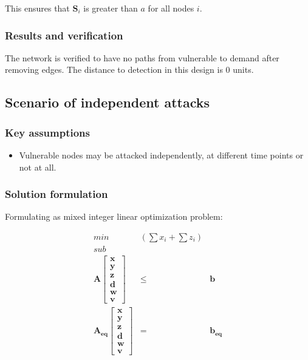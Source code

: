 \documentclass[authoryear,preprint,review,12pt]{elsarticle}
\begin{document}
This ensures that $\mathbf{S}_{i}$ is greater than $a$ for all nodes $i$.


\subsubsection{Results and verification}
The network is verified to have no paths from vulnerable to demand
after removing edges.
The distance to detection in this design is $0$ units.



\subsection{\label{sub:Scenario-3:independent-vulnerable}Scenario of independent attacks}
\subsubsection{Key assumptions}
\begin{itemize}
    \item  Vulnerable nodes may be attacked independently, at different time points or not at all.
\end{itemize}


\subsubsection{Solution formulation}

Formulating as mixed integer linear optimization problem:

\begin{eqnarray*}
min & (\sum x_{i}+\sum z_{i})\\
sub\\
\mathbf{A}\left[\begin{array}{c}
\mathbf{x}\\
\mathbf{y}\\
\mathbf{z}\\
\mathbf{d}\\
\mathbf{w}\\
\mathbf{v}
\end{array}\right] & \leq & \mathbf{b}\\
\mathbf{A_{eq}}\left[\begin{array}{c}
\mathbf{x}\\
\mathbf{y}\\
\mathbf{z}\\
\mathbf{d}\\
\mathbf{w}\\
\mathbf{v}
\end{array}\right] & = & \mathbf{b_{eq}}
\end{eqnarray*}
\end{document}
